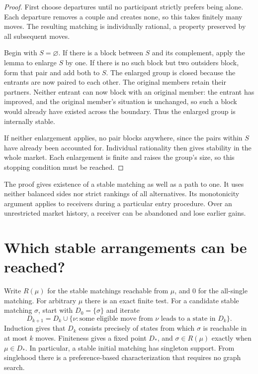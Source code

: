 \documentclass[11pt]{article}
\begin{document}
\begin{proof}
First choose departures until no participant strictly prefers being alone. Each departure removes a couple and creates none, so this takes finitely many moves. The resulting matching is individually rational, a property preserved by all subsequent moves.

Begin with \(S=\varnothing\). If there is a block between \(S\) and its complement, apply the lemma to enlarge \(S\) by one. If there is no such block but two outsiders block, form that pair and add both to \(S\). The enlarged group is closed because the entrants are now paired to each other. The original members retain their partners. Neither entrant can now block with an original member: the entrant has improved, and the original member's situation is unchanged, so such a block would already have existed across the boundary. Thus the enlarged group is internally stable.

If neither enlargement applies, no pair blocks anywhere, since the pairs within \(S\) have already been accounted for. Individual rationality then gives stability in the whole market. Each enlargement is finite and raises the group's size, so this stopping condition must be reached.
\end{proof}

The proof gives existence of a stable matching as well as a path to one. It uses neither balanced sides nor strict rankings of all alternatives. Its monotonicity argument applies to receivers during a particular entry procedure. Over an unrestricted market history, a receiver can be abandoned and lose earlier gains.

\section{Which stable arrangements can be reached?}

Write \(R(\mu)\) for the stable matchings reachable from \(\mu\), and \(0\) for the all-single matching. For arbitrary \(\mu\) there is an exact finite test. For a candidate stable matching \(\sigma\), start with \(D_0=\{\sigma\}\) and iterate
\[
 D_{k+1}=D_k\cup\{\nu:\text{some eligible move from }\nu
                              \text{ leads to a state in }D_k\}.
\]
Induction gives that \(D_k\) consists precisely of states from which \(\sigma\) is reachable in at most \(k\) moves. Finiteness gives a fixed point \(D_*\), and \(\sigma\in R(\mu)\) exactly when \(\mu\in D_*\). In particular, a stable initial matching has singleton support. From singlehood there is a preference-based characterization that requires no graph search.
\end{document}
